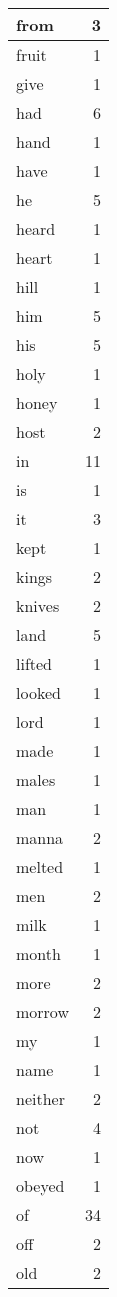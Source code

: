 \begin{center}
\begin{longtable}{l|r}
from & 3 \\ \hline
fruit & 1 \\ \hline
give & 1 \\ \hline
had & 6 \\ \hline
hand & 1 \\ \hline
have & 1 \\ \hline
he & 5 \\ \hline
heard & 1 \\ \hline
heart & 1 \\ \hline
hill & 1 \\ \hline
him & 5 \\ \hline
his & 5 \\ \hline
holy & 1 \\ \hline
honey & 1 \\ \hline
host & 2 \\ \hline
in & 11 \\ \hline
is & 1 \\ \hline
it & 3 \\ \hline
kept & 1 \\ \hline
kings & 2 \\ \hline
knives & 2 \\ \hline
land & 5 \\ \hline
lifted & 1 \\ \hline
looked & 1 \\ \hline
lord & 1 \\ \hline
made & 1 \\ \hline
males & 1 \\ \hline
man & 1 \\ \hline
manna & 2 \\ \hline
melted & 1 \\ \hline
men & 2 \\ \hline
milk & 1 \\ \hline
month & 1 \\ \hline
more & 2 \\ \hline
morrow & 2 \\ \hline
my & 1 \\ \hline
name & 1 \\ \hline
neither & 2 \\ \hline
not & 4 \\ \hline
now & 1 \\ \hline
obeyed & 1 \\ \hline
of & 34 \\ \hline
off & 2 \\ \hline
old & 2 \\ \hline

\end{longtable}
\end{center}
